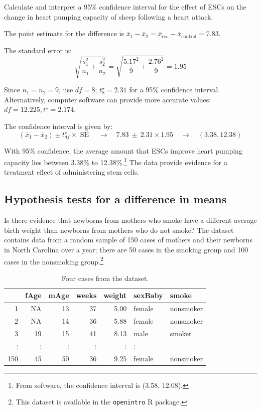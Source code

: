 \begin{example}{Calculate and interpret a 95\% confidence interval for the effect of ESCs on the change in heart pumping capacity of sheep following a heart attack.}
	
The point estimate for the difference is $\overline{x}_1 - \overline{x}_2 = \overline{x}_{\text{esc}} - \overline{x}_{\text{control}} = 7.83$.	
	
The standard error is:	
\[\sqrt{\frac{s_{1}^2}{n_{1}} + \frac{s_{2}^2}{n_{2}}} = \sqrt{\frac{5.17^2}{9} + \frac{2.76^2}{9}} = 1.95\]
	
Since $n_1 = n_2 = 9$, use $df = 8$; $t^{\star}_{8} = 2.31$ for a 95\% confidence interval. Alternatively, computer software can provide more accurate values: $df = 12.225, t^\star = 2.174$.

The confidence interval is given by:
\[(\overline{x}_{1} - \overline{x}_{2}) \pm t^\star_{df} \times \text{ SE } \quad\rightarrow\quad
7.83 \ \pm\ 2.31\times 1.95 \quad\rightarrow\quad (3.38, 12.38) \]

With 95\% confidence, the average amount that ESCs improve heart pumping capacity lies between 3.38\% to 12.38\%.\footnote{From software, the confidence interval is (3.58, 12.08).} The data provide evidence for a treatment effect of administering stem cells.
\end{example}



\subsection{Hypothesis tests for a difference in means}
\label{testingDifferenceMeans}




Is there evidence that newborns from mothers who smoke have a different average birth weight than newborns from mothers who do not smoke? The dataset  contains data from a random sample of 150 cases of mothers and their newborns in North Carolina over a year; there are 50 cases in the smoking group and 100 cases in the nonsmoking group.\footnote{This dataset is available in the \texttt{openintro} \textsf{R} package. }

\begin{table}[h]
\centering
\begin{tabular}{rrrrrll}
  \hline
 & fAge & mAge & weeks & weight & sexBaby & smoke \\ 
  \hline
1 & NA & 13 &  37 & 5.00 & female & nonsmoker \\ 
  2 & NA & 14 &  36 & 5.88 & female & nonsmoker \\ 
  3 & 19 & 15 &  41 & 8.13 & male & smoker \\ 
  $\vdots$ &   $\vdots$ &   $\vdots$ &   $\vdots$ &   $\vdots$ &   $\vdots$ \\
  150 & 45 & 50 &  36 & 9.25 & female & nonsmoker \\ 
   \hline
\end{tabular}
\caption{Four cases from the  dataset.}
\label{babySmokeDF}
\end{table}

